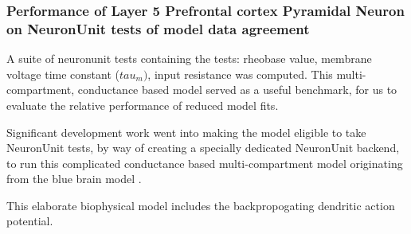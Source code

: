 \subsubsection{Performance of Layer 5 Prefrontal cortex Pyramidal Neuron on NeuronUnit tests of model data agreement}
\cite{van2016bluepyopt}
A suite of neuronunit tests containing the tests: rheobase value, membrane voltage time constant ($tau_{m})$, input resistance was computed. This multi-compartment, conductance based model served as a useful benchmark, for us to evaluate the relative performance of reduced model fits.

Significant development work went into making the model eligible to take NeuronUnit tests, by way of creating a specially dedicated NeuronUnit backend, to run this complicated conductance based multi-compartment model originating from the blue brain model \cite{markram2015reconstruction}.

This elaborate biophysical model includes the backpropogating dendritic action potential.
\url{}



